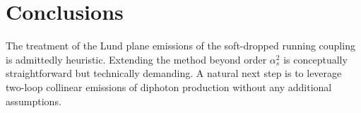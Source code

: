 \section{Conclusions}\label{sec:conclusions}

The treatment of the Lund plane emissions of the soft-dropped running
coupling is admittedly heuristic. Extending the method beyond order
$\alpha_s^2$ is conceptually straightforward but technically demanding.
A natural next step is to leverage two-loop collinear emissions of
diphoton production without any additional assumptions.

